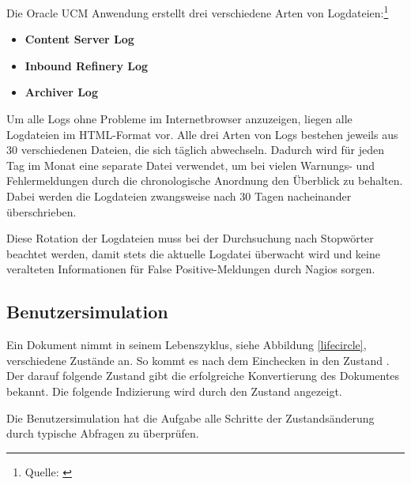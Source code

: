 Die Oracle UCM Anwendung erstellt drei verschiedene Arten von Logdateien:\footnote{Quelle: \cite{UCMlog09}}

\begin{itemize}
\item \textbf{Content Server Log} 
\item \textbf{Inbound Refinery Log}
\item \textbf{Archiver Log}
\end{itemize}

Um alle Logs ohne Probleme im Internetbrowser anzuzeigen, liegen alle Logdateien im HTML-Format vor.
Alle drei Arten von Logs bestehen jeweils aus 30 verschiedenen Dateien, die sich täglich abwechseln.
Dadurch wird für jeden Tag im Monat eine separate Datei verwendet, um bei vielen Warnungs- und Fehlermeldungen durch die chronologische Anordnung den Überblick zu behalten.
Dabei werden die Logdateien zwangsweise nach 30 Tagen nacheinander überschrieben.

Diese Rotation der Logdateien muss bei der Durchsuchung nach Stopwörter beachtet werden, damit stets die aktuelle Logdatei überwacht wird und keine veralteten Informationen für False Positive-Meldungen durch Nagios sorgen.


\subsection{Benutzersimulation}

Ein Dokument nimmt in seinem Lebenszyklus, siehe Abbildung \ref{lifecircle}, verschiedene Zustände an.
So kommt es nach dem Einchecken in den Zustand .
Der darauf folgende Zustand  gibt die erfolgreiche Konvertierung des Dokumentes bekannt.
Die folgende Indizierung wird durch den Zustand  angezeigt.

Die Benutzersimulation hat die Aufgabe alle Schritte der Zustandsänderung durch typische Abfragen zu überprüfen.

